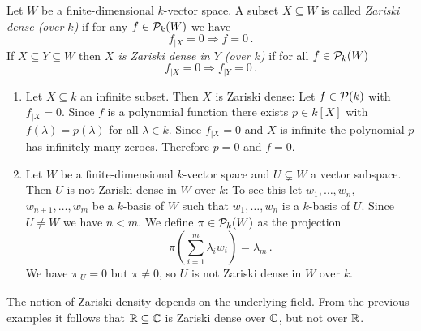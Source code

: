 \begin{definition}
  Let $W$ be a finite-dimensional $k$-vector space.
  A subset $X \subseteq W$ is called \emph{Zariski dense (over $k$)} if for any $f \in \mathcal{P}_k(W)$ we have
  \[
                f_{|X} = 0
    \Rightarrow f = 0 \,.
  \]
  If $X \subseteq Y \subseteq W$ then \emph{$X$ is Zariski dense in $Y$ (over $k$)} if for all $f \in \mathcal{P}_k(W)$
  \[
                f_{|X} = 0
    \Rightarrow f_{|Y} = 0 \,.
  \]
\end{definition}


\begin{example}
  \begin{enumerate}[label=\emph{\alph*)},leftmargin=*]
    \item 
      Let $X \subseteq k$ an infinite subset.
      Then $X$ is Zariski dense:
      Let $f \in \mathcal{P}(k)$ with $f_{|X} = 0$.
      Since $f$ is a polynomial function there exists $p \in k[X]$ with $f(\lambda) = p(\lambda)$ for all $\lambda \in k$.
      Since $f_{|X} = 0$ and $X$ is infinite the polynomial $p$ has infinitely many zeroes.
      Therefore $p = 0$ and $f = 0$.
    \item
      Let $W$ be a finite-dimensional $k$-vector space and $U \subsetneq W$ a vector subspace.
      Then $U$ is not Zariski dense in $W$ over $k$:
      To see this let $w_1, \dotsc, w_n$, $w_{n+1}, \dotsc, w_m$ be a $k$-basis of $W$ such that $w_1, \dotsc, w_n$ is a $k$-basis of $U$.
      Since $U \neq W$ we have $n < m$.
      We define $\pi \in \mathcal{P}_k(W)$ as the projection
      \[
          \pi\left( \sum_{i=1}^m \lambda_i w_i \right)
        = \lambda_m \,.
      \]
      We have $\pi_{|U} = 0$ but $\pi \neq 0$, so $U$ is not Zariski dense in $W$ over $k$.
  \end{enumerate}
\end{example}


\begin{warning}
  The notion of Zariski density depends on the underlying field.
  From the previous examples it follows that $\mathbb{R} \subseteq \mathbb{C}$ is Zariski dense over $\mathbb{C}$, but not over $\mathbb{R}$.
\end{warning}



